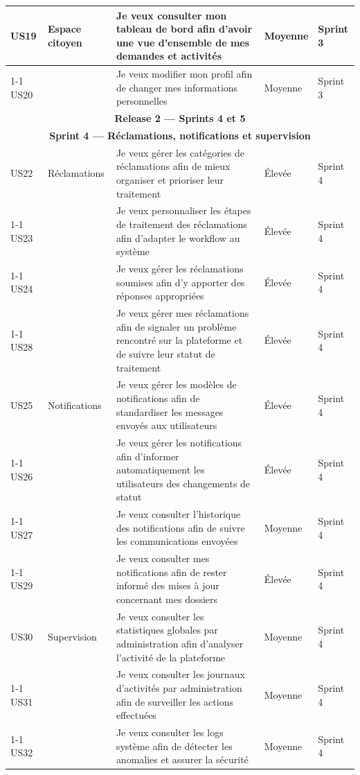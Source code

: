 \begin{longtable}{|p{0.8cm}|p{2.5cm}|p{6.2cm}|p{1.5cm}|p{1.5cm}|}
US19 & Espace citoyen
     & Je veux consulter mon tableau de bord afin d'avoir une vue d'ensemble de mes demandes et activités & Moyenne & Sprint 3 \\ \cline{1-1}\cline{3-5}
US20 & & Je veux modifier mon profil afin de changer mes informations personnelles & Moyenne & Sprint 3 \\ \hline

\multicolumn{5}{|c|}{\cellcolor{orange!40}\textbf{Release 2 — Sprints 4 et 5}} \\ \hline

\multicolumn{5}{|c|}{\cellcolor{orange!15}\textbf{Sprint 4 — Réclamations, notifications et supervision}} \\ \hline

US22 & Réclamations
     & Je veux gérer les catégories de réclamations afin de mieux organiser et prioriser leur traitement & Élevée & Sprint 4 \\ \cline{1-1}\cline{3-5}
US23 & & Je veux personnaliser les étapes de traitement des réclamations afin d'adapter le workflow au système & Élevée & Sprint 4 \\ \cline{1-1}\cline{3-5}
US24 & & Je veux gérer les réclamations soumises afin d'y apporter des réponses appropriées & Élevée & Sprint 4 \\ \cline{1-1}\cline{3-5}
US28 & & Je veux gérer mes réclamations afin de signaler un problème rencontré sur la plateforme et de suivre leur statut de traitement & Élevée & Sprint 4 \\ \hline

US25 & Notifications
     & Je veux gérer les modèles de notifications afin de standardiser les messages envoyés aux utilisateurs & Élevée & Sprint 4 \\ \cline{1-1}\cline{3-5}
US26 & & Je veux gérer les notifications afin d'informer automatiquement les utilisateurs des changements de statut & Élevée & Sprint 4 \\ \cline{1-1}\cline{3-5}
US27 & & Je veux consulter l'historique des notifications afin de suivre les communications envoyées & Moyenne & Sprint 4 \\ \cline{1-1}\cline{3-5}
US29 & & Je veux consulter mes notifications afin de rester informé des mises à jour concernant mes dossiers & Élevée & Sprint 4 \\ \hline

US30 & Supervision
     & Je veux consulter les statistiques globales par administration afin d'analyser l'activité de la plateforme & Moyenne & Sprint 4 \\ \cline{1-1}\cline{3-5}
US31 & & Je veux consulter les journaux d'activités par administration afin de surveiller les actions effectuées & Moyenne & Sprint 4 \\ \cline{1-1}\cline{3-5}
US32 & & Je veux consulter les logs système afin de détecter les anomalies et assurer la sécurité & Moyenne & Sprint 4 \\ \hline


\end{longtable}
